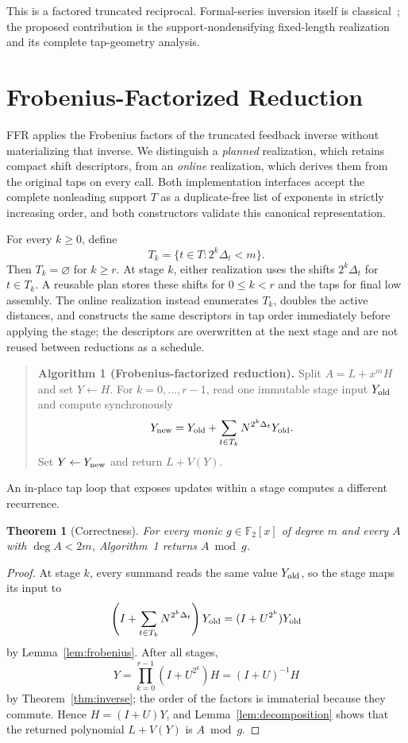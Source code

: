 \documentclass{mcom-l}
\numberwithin{equation}{section}
\newtheorem{theorem}{Theorem}[section]
\theoremstyle{definition}
\theoremstyle{remark}
\newcommand{\Ftwo}{\mathbb{F}_2}
\newcommand{\poly}{\Ftwo[x]}
\begin{document}
This is a factored truncated reciprocal.  Formal-series inversion itself is
classical~\cite{Kalorkoti1993}; the proposed contribution is the
support-nondensifying fixed-length realization and its complete tap-geometry
analysis.

\section{Frobenius-Factorized Reduction}
\label{sec:algorithm}

FFR applies the Frobenius factors of the truncated feedback inverse without
materializing that inverse.  We distinguish a \emph{planned} realization,
which retains compact shift descriptors, from an \emph{online} realization,
which derives them from the original taps on every call.
Both implementation interfaces accept the complete nonleading support $T$ as
a duplicate-free list of exponents in strictly increasing order, and both
constructors validate this canonical representation.

For every $k\ge0$, define
\begin{equation}
  T_k=\{t\in T:2^k\Delta_t<m\}.
\end{equation}
Then $T_k=\varnothing$ for $k\ge r$.  At stage $k$, either realization uses
the shifts $2^k\Delta_t$ for $t\in T_k$.  A reusable plan stores these shifts
for $0\le k<r$ and the taps for final low assembly.  The online realization
instead enumerates $T_k$, doubles the active distances, and constructs the
same descriptors in tap order immediately before applying the stage; the
descriptors are overwritten at the next stage and are not reused between
reductions as a schedule.

\begin{quote}
\textbf{Algorithm 1 (Frobenius-factorized reduction).}
Split $A=L+x^mH$ and set $Y\leftarrow H$.  For $k=0,\ldots,r-1$, read one
immutable stage input $Y_{\rm old}$ and compute synchronously
\begin{equation*}
  Y_{\rm new}=Y_{\rm old}
  +\sum_{t\in T_k}N^{2^k\Delta_t}Y_{\rm old}.
\end{equation*}
Set $Y\leftarrow Y_{\rm new}$ and return $L+V(Y)$.
\end{quote}

An in-place tap loop that exposes updates within a stage computes a different
recurrence.

\begin{theorem}[Correctness]
\label{thm:correctness}
For every monic $g\in\poly$ of degree $m$ and every $A$ with $\deg A<2m$,
Algorithm~1 returns $A\bmod g$.
\end{theorem}
\begin{proof}
At stage $k$, every summand reads the same value $Y_{\rm old}$, so the stage
maps its input to
\[
  \left(I+\sum_{t\in T_k}N^{2^k\Delta_t}\right)Y_{\rm old}
  =(I+U^{2^k})Y_{\rm old}
\]
by Lemma~\ref{lem:frobenius}.  After all stages,
\[
  Y=\prod_{k=0}^{r-1}(I+U^{2^k})H=(I+U)^{-1}H
\]
by Theorem~\ref{thm:inverse}; the order of the factors is immaterial because
they commute.  Hence $H=(I+U)Y$, and Lemma~\ref{lem:decomposition} shows that
the returned polynomial $L+V(Y)$ is $A\bmod g$.
\end{proof}
\end{document}
